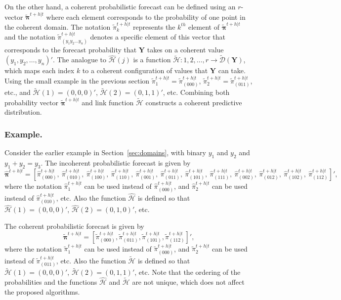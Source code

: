 \documentclass[a4paper,review,12pt,authoryear]{elsarticle}
\newcommand{\bY}{\mathbf{Y}}
\newcommand{\bpi}{\bm{\pi}}
\begin{document}
  On the other hand, a coherent probabilistic forecast can be defined using an $r$-vector $\tilde{\bpi}^{t+h|t}$ where each element corresponds to the probability of one point in the coherent domain.
  The notation $\tilde{\pi}_k^{t+h|t}$ represents the $k^{th}$ element of $\tilde{\bpi}^{t+h|t}$ and the notation $\tilde{\pi}_{(y_1 y_2 \dots y_n)}^{t+h|t}$ denotes a specific element of this vector that corresponds to the forecast probability that $\bY$ takes on a coherent value $(y_1,y_2,\dots,y_n)'$.
  The analogue to $\hat{\mathcal{H}}(j)$ is a function  $\tilde{\mathcal{H}}:{1,2,\dots,r}\rightarrow\tilde{\mathcal{D}}(\bY)$, which maps each index $k$ to a coherent configuration of values that $\bY$ can take.
  Using the small example in the previous section $\tilde{\pi}_1^{t+h|t}=\tilde{\pi}_{(000)}^{t+h|t}$, $\tilde{\pi}_2^{t+h|t}=\tilde{\pi}_{(011)}^{t+h|t}$, etc., and $\tilde{\mathcal{H}}(1)=(0,0,0)'$, $\tilde{\mathcal{H}}(2)=(0,1,1)'$, etc.
  Combining both probability vector $\tilde{\bpi}^{t+h|t}$ and link function $\tilde{\mathcal{H}}$ constructs a coherent predictive distribution.

  \subsubsection*{\textbf{Example}.}

  Consider the earlier example in Section~\ref{sec:domains}, with binary $y_1$ and $y_2$ and $y_1+y_2=y_3$. The incoherent probabilistic forecast is given by
  \[
    \hat{\bpi}^{t+h|t}= \left[
      \hat{\pi}^{t+h|t}_{(000)}, ~
       \hat{\pi}^{t+h|t}_{(010)},~
       \hat{\pi}^{t+h|t}_{(100)},~
       \hat{\pi}^{t+h|t}_{(110)},~
       \hat{\pi}^{t+h|t}_{(001)},~
       \hat{\pi}^{t+h|t}_{(011)},~
       \hat{\pi}^{t+h|t}_{(101)},~
       \hat{\pi}^{t+h|t}_{(111)},~
       \hat{\pi}^{t+h|t}_{(002)},~
       \hat{\pi}^{t+h|t}_{(012)},~
       \hat{\pi}^{t+h|t}_{(102)},~
       \hat{\pi}^{t+h|t}_{(112)}
       \right]',
  \]
  where the notation $\hat{\pi}^{t+h|t}_{1}$ can be used instead of $\hat{\pi}^{t+h|t}_{(000)}$, and $\hat{\pi}^{t+h|t}_{2}$ can be used instead of $\hat{\pi}^{t+h|t}_{(010)}$, etc. Also the function $\hat{\mathcal{H}}$ is defined so that $\hat{\mathcal{H}}(1)=(0,0,0)'$, $\hat{\mathcal{H}}(2)=(0,1,0)'$, etc.

  The coherent probabilistic forecast is given by
  \[
  \tilde{\bpi}^{t+h|t}=\left[
  \tilde{\pi}^{t+h|t}_{(000)},
  \tilde{\pi}^{t+h|t}_{(011)},
  \tilde{\pi}^{t+h|t}_{(101)},
  \tilde{\pi}^{t+h|t}_{(112)}
  \right]',\]
  where the notation $\tilde{\pi}^{t+h|t}_{1}$ can be used instead of $\tilde{\pi}^{t+h|t}_{(000)}$, and $\tilde{\pi}^{t+h|t}_{2}$ can be used instead of $\tilde{\pi}^{t+h|t}_{(011)}$, etc. Also the function $\tilde{\mathcal{H}}$ is defined so that $\tilde{\mathcal{H}}(1)=(0,0,0)'$, $\tilde{\mathcal{H}}(2)=(0,1,1)'$, etc. Note that the ordering of the probabilities and the functions $\hat{\mathcal{H}}$ and $\tilde{\mathcal{H}}$ are not unique, which does not affect the proposed algorithms.
\end{document}

